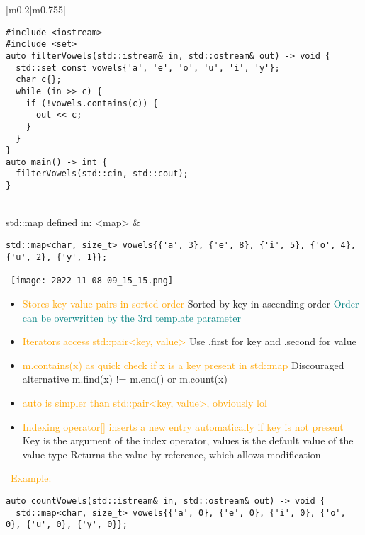 \documentclass[main.tex,fontsize=8pt,paper=a4,paper=portrait,DIV=calc,]{scrartcl}
\begin{document}
\begin{table}[ht!]
\begin{tabular}{|m{0.2\linewidth}|m{0.755\linewidth}|}
\begin{lstlisting}
#include <iostream>
#include <set>
auto filterVowels(std::istream& in, std::ostream& out) -> void {
  std::set const vowels{'a', 'e', 'o', 'u', 'i', 'y'};
  char c{};
  while (in >> c) {
    if (!vowels.contains(c)) {
      out << c;
    }
  }
}
auto main() -> int {
  filterVowels(std::cin, std::cout);
}
\end{lstlisting}\\
\hline
std::map  \newline 
defined in: <map> &
\begin{lstlisting}
std::map<char, size_t> vowels{{'a', 3}, {'e', 8}, {'i', 5}, {'o', 4}, {'u', 2}, {'y', 1}};
\end{lstlisting}
\, \newline
\texttt{[image: 2022-11-08-09\_15\_15.png]}\newline
\begin{itemize}
\item \textcolor{Orange}{Stores key-value pairs in sorted order}\newline
  Sorted by key in ascending order\newline
  \textcolor{teal}{Order can be overwritten by the 3rd template parameter}
\item \textcolor{Orange}{Iterators access std::pair<key, value>}\newline
  Use .first for key and .second for value
\item \textcolor{orange}{m.contains(x) as quick check if x is a key present in std::map}\newline
  Discouraged alternative m.find(x) != m.end() or m.count(x)
\item \textcolor{orange}{auto is simpler than std::pair<key, value>, obviously lol}
\item \textcolor{orange}{Indexing operator[] inserts a new entry automatically if key is not present}\newline
  Key is the argument of the index operator, values is the default value of the value type\newline
  Returns the value by reference, which allows modification
\vspace{-2mm}
\end{itemize} 
\, \newline
\textcolor{orange}{Example:}\newline
\begin{lstlisting}
auto countVowels(std::istream& in, std::ostream& out) -> void {
  std::map<char, size_t> vowels{{'a', 0}, {'e', 0}, {'i', 0}, {'o', 0}, {'u', 0}, {'y', 0}};

\end{lstlisting}
\end{tabular}
\end{table}
\end{document}
